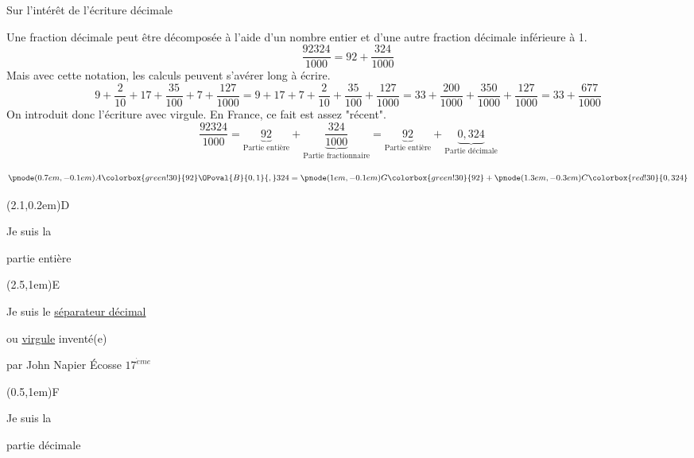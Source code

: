 
\begin{remarque}
   Sur l'intérêt de l'écriture décimale

   Une fraction décimale peut être décomposée à l'aide d'un nombre entier et d'une autre fraction décimale inférieure à 1.
$$\dfrac{\num{92324}}{\num{1000}}=92+\dfrac{324}{\num{1000}}$$
Mais avec cette notation, les calculs peuvent s'avérer long à écrire.
$$9+\dfrac{2}{10}+17+\dfrac{35}{100}+7+\dfrac{127}{\num{1000}}=9+17+7+\dfrac{2}{10}+\dfrac{35}{100}+\dfrac{127}{\num{1000}}= 33+\dfrac{200}{\num{1000}}+\dfrac{350}{\num{1000}}+\dfrac{127}{\num{1000}}=33+\dfrac{677}{\num{1000}}$$
On introduit donc l'écriture avec virgule. En France, ce fait est assez "récent".
$$\dfrac{\num{92324}}{\num{1000}}=\underbrace{92}_{\text{Partie entière}}+\underbrace{\dfrac{324}{\num{1000}}}_{\text{Partie fractionnaire}}=\underbrace{92}_{\text{Partie entière}}+\underbrace{0,324}_{\text{Partie décimale}}$$
\end{remarque}

\pagebreak
\begin{Huge}
$$\pnode(0.7em,-0.1em){A}{\colorbox{green!30}{92}} \OPoval{B}{0,1}{,}324 = \pnode(1em,-0.1em){G}{\colorbox{green!30}{92}} + \pnode(1.3em,-0.3em){C}{\colorbox{red!30}{0,324}}$$\end{Huge}
\par\vspace{0.75cm}
\begin{minipage}{0.3\linewidth}
\pnode(2.1,0.2em){D}{Je suis la 

\colorbox{green!30}{partie entière}}
\end{minipage}
\hfill
\begin{minipage}{0.35\linewidth}
\pnode(2.5,1em){E}{Je suis le \underline{séparateur décimal}

ou \underline{virgule} inventé(e)

par John Napier Écosse $17^{\grave{e}me}$}
\end{minipage}
\hfill
\begin{minipage}{0.3\linewidth}
\pnode(0.5,1em){F}{Je suis la

\colorbox{red!30}{partie décimale}}
\end{minipage}


